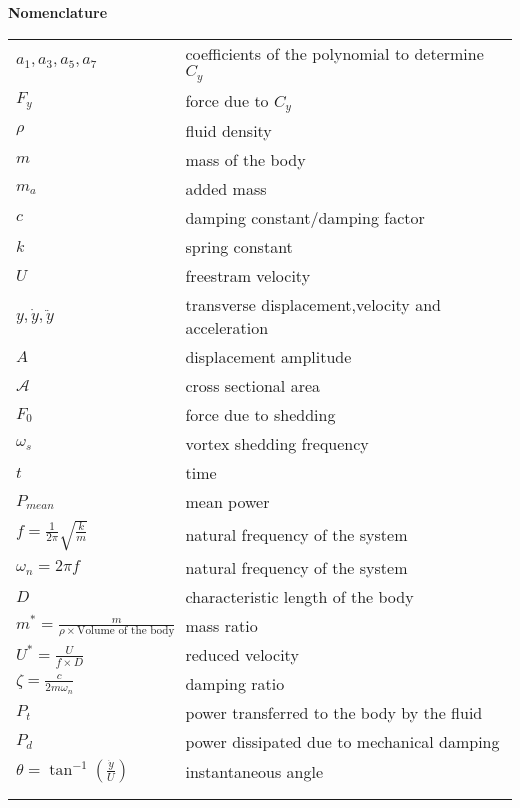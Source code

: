 \textbf{Nomenclature}



\begin{tabular}{ll}
$a_1,a_3,a_5,a_7$ & coefficients of the polynomial to determine $C_y$ \\ 
$F_y$ & force due to $C_y$  \\ 
$\rho$ & fluid density  \\
$m$ & mass of the body \\
$m_a$ & added mass \\
$c$ & damping constant/damping factor \\
$k$ & spring constant \\
$U$ & freestram velocity \\
$y,\dot{y},\ddot{y}$ & transverse displacement,velocity and acceleration   \\
$A$ & displacement amplitude\\
$\mathcal{A}$ & cross sectional area\\ 
$F_0$& force due to shedding \\
$\omega_s$& vortex shedding frequency \\
$t$ & time \\
$P_{mean}$& mean power \\
$f=\frac{1}{2\pi}\sqrt{\frac{k}{m}}$& natural frequency of the system \\
$\omega_n= 2 \pi f$& natural frequency of the system  \\
$D$ & characteristic length of the body  \\
$m^*=\frac{m}{\rho \times \text{Volume of the body}}$& mass ratio \\
$U^*=\frac{U}{f \times D}$& reduced velocity  \\
$\zeta= \frac{c}{2 m \omega_n}$& damping ratio \\
$P_t$   & power transferred to the body by the fluid \\
$P_d$& power dissipated due to mechanical damping  \\
$\theta= \tan^{-1}{(\frac{\dot{y}}{U})}$& instantaneous angle \\
& \\
& \\
\end{tabular}  